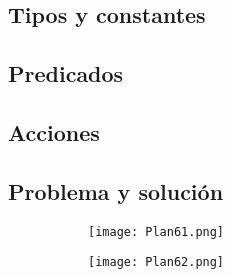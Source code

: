 \subsection{Tipos y constantes}
\subsection{Predicados}
\subsection{Acciones}
\subsection{Problema y solución}
\begin{figure}[H]

   \begin{subfigure}[b]{0.5\textwidth}
      \centering
      \texttt{[image: Plan61.png]}
   \end{subfigure}
   \hfill
   \begin{subfigure}[b]{0.5\textwidth}
      \centering
      \texttt{[image: Plan62.png]}
   \end{subfigure}
\end{figure}
